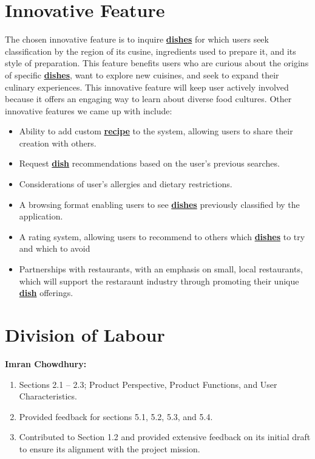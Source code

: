 \documentclass[]{article}
\begin{document}


\section{Innovative Feature}

The chosen innovative feature is to inquire \hyperref[Dish]{\textbf{dishes}} for which users seek classification by the region of its cusine, ingredients used to prepare it, and its style of preparation. 
This feature benefits users who are curious about the origins of specific \hyperref[Dish]{\textbf{dishes}}, want to explore new cuisines, and seek to expand their culinary experiences.
This innovative feature will keep user actively involved because it offers an engaging way to learn about diverse food cultures.
Other innovative features we came up with include:

\begin{itemize}
	\item Ability to add custom \hyperref[Recipe]{\textbf{recipe}} to the system, allowing users to share their creation with others.
	\item Request \hyperref[Dish]{\textbf{dish}} recommendations based on the user's previous searches.
	\item Considerations of user's allergies and dietary restrictions.
	\item A browsing format enabling users to see \hyperref[Dish]{\textbf{dishes}} previously classified by the application.
	\item A rating system, allowing users to recommend to others which \hyperref[Dish]{\textbf{dishes}} to try and which to avoid
	\item Partnerships with restaurants, with an emphasis on small, local restaurants, which will support the restaraunt industry
	through promoting their unique \hyperref[Dish]{\textbf{dish}} offerings.
\end{itemize}

\appendix
\section{Division of Labour}
\label{sec:division_of_labour}

\textbf{Imran Chowdhury:}
\begin{enumerate}
	\item Sections 2.1 -- 2.3; Product Perspective, Product Functions, and User Characteristics.
	\item Provided feedback for sections 5.1, 5.2, 5.3, and 5.4.
	\item Contributed to Section 1.2 and provided extensive feedback on its initial draft to ensure its alignment with the project mission.
\end{enumerate}
\end{document}
